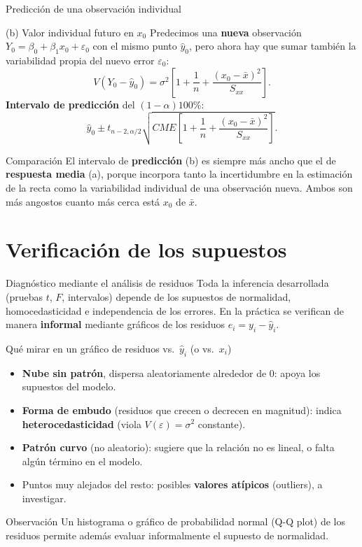 \documentclass[aspectratio=169,11pt]{beamer}
\begin{document}
\begin{frame}{Predicción de una observación individual}
\begin{block}{(b) Valor individual futuro en $x_0$}
Predecimos una \textbf{nueva} observación $Y_0 = \beta_0+\beta_1 x_0+\varepsilon_0$ con el mismo punto $\hat y_0$, pero ahora hay que sumar también la variabilidad propia del nuevo error $\varepsilon_0$:
\[
V(Y_0-\hat y_0) = \sigma^2\left[1+\frac{1}{n}+\frac{(x_0-\bar x)^2}{S_{xx}}\right].
\]
\textbf{Intervalo de predicción} del $(1-\alpha)100\%$:
\[
\hat y_0 \pm t_{n-2,\alpha/2}\sqrt{CME\left[1+\frac{1}{n}+\frac{(x_0-\bar x)^2}{S_{xx}}\right]}.
\]
\end{block}

\begin{alertblock}{Comparación}
El intervalo de \textbf{predicción} (b) es siempre más ancho que el de \textbf{respuesta media} (a), porque incorpora tanto la incertidumbre en la estimación de la recta como la variabilidad individual de una observación nueva. Ambos son más angostos cuanto más cerca está $x_0$ de $\bar x$.
\end{alertblock}
\end{frame}

\section{Verificación de los supuestos}

\begin{frame}{Diagnóstico mediante el análisis de residuos}
Toda la inferencia desarrollada (pruebas $t$, $F$, intervalos) depende de los supuestos de normalidad, homocedasticidad e independencia de los errores. En la práctica se verifican de manera \textbf{informal} mediante gráficos de los residuos $e_i = y_i-\hat y_i$.

\begin{block}{Qué mirar en un gráfico de residuos vs.\ $\hat y_i$ (o vs.\ $x_i$)}
\begin{itemize}
\item \textbf{Nube sin patrón}, dispersa aleatoriamente alrededor de $0$: apoya los supuestos del modelo.
\item \textbf{Forma de embudo} (residuos que crecen o decrecen en magnitud): indica \textbf{heterocedasticidad} (viola $V(\varepsilon)=\sigma^2$ constante).
\item \textbf{Patrón curvo} (no aleatorio): sugiere que la relación no es lineal, o falta algún término en el modelo.
\item Puntos muy alejados del resto: posibles \textbf{valores atípicos} (outliers), a investigar.
\end{itemize}
\end{block}

\begin{alertblock}{Observación}
Un histograma o gráfico de probabilidad normal (Q-Q plot) de los residuos permite además evaluar informalmente el supuesto de normalidad.
\end{alertblock}
\end{frame}
\end{document}
